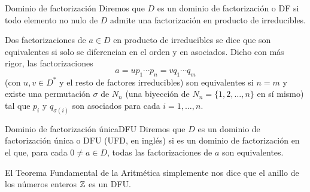 \begin{definition}{Dominio de factorización}{}
Diremos que \(D\) es un dominio de factorización o DF si todo elemento no nulo de \(D\) admite una factorización en producto de irreducibles.
\end{definition}

Dos factorizaciones de \(a \in D\) en producto de irreducibles se dice que son equivalentes si solo se diferencian en el orden y en asociados. Dicho con más rigor, las factorizaciones
\[
a = u p_1 \cdots p_n = v q_1 \cdots q_m
\]
(con \(u, v \in D^*\) y el resto de factores irreducibles) son equivalentes si \(n = m\) y existe una permutación \(\sigma\) de \(N_n\) (una biyección de \(N_n = \{1, 2, \ldots, n\}\) en sí mismo) tal que \(p_i\) y \(q_{\sigma(i)}\) son asociados para cada \(i = 1, \ldots, n\).

\begin{definition}{Dominio de factorización única}{DFU}
Diremos que \(D\) es un dominio de factorización única o DFU (UFD, en inglés) si es un dominio de factorización en el que, para cada \(0 \neq a \in D\), todas las factorizaciones de \(a\) son equivalentes.
\end{definition}

\begin{example}{}{}
El Teorema Fundamental de la Aritmética simplemente nos dice que el anillo de los números enteros \( \mathbb{Z} \) es un DFU.
\end{example}

